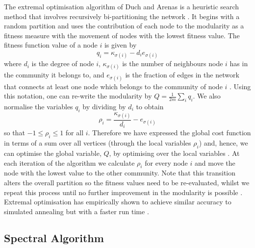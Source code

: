 The extremal optimisation algorithm of Duch and Arenas \cite{DA05} is a heuristic search method that involves recursively bi-partitioning the network \cite{DA05,For10}.
It begins with a random partition and uses the contribution of each node to the modularity as a fitness measure with the movement of nodes with the lowest fitness value.
The fitness function value of a node $i$ is given by
\begin{equation}
	\label{eq:fitnessFunction}
	q_{i} = \kappa_{\sigma(i)} - d_{i}e_{\sigma(i)}
\end{equation}
where $d_{i}$ is the degree of node $i$, $\kappa_{\sigma(i)}$ is the number of neighbours node $i$ has in the community it belongs to, and $e_{\sigma(i)}$ is the fraction of edges in the network that connects at least one node which belongs to the community of node $i$ \cite{DA05,For10}.
Using this notation, one can re-write the modularity by $Q = \frac{1}{2m} \sum_{i} q_{i}$.
We also normalise the variables $q_{i}$ by dividing by $d_{i}$ to obtain
\begin{equation}
	\label{eq:normalisedFitnessFunction}
	\rho_{i} = \frac{\kappa_{\sigma(i)}}{d_{i}} - e_{\sigma(i)}
\end{equation}
so that $-1 \leq \rho_{i}  \leq 1$ for all $i$.
Therefore we have expressed the global cost function in terms of a sum over all vertices (through the local variables $\rho_{i}$) and, hence, we can optimise the global variable, $Q$, by optimising over the local variables \cite{For10}.
At each iteration of the algorithm we calculate $\rho_{i}$ for every node $i$ and move the node with the lowest value to the other community.
Note that this transition alters the overall partition so the fitness values need to be re-evaluated, whilst we repeat this process until no further improvement in the modularity is possible \cite{DA05,For10}.
Extremal optimisation has empirically shown to achieve similar accuracy to simulated annealing but with a faster run time \cite{For10}.


\subsection{Spectral Algorithm}
\label{subsec:spectralAlgorithm}

